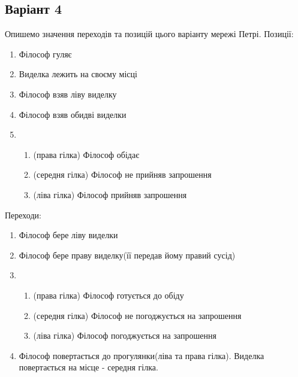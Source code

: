 \subsection*{Варіант 4}

Опишемо значення переходів та позицій цього варіанту мережі Петрі.
Позиції:
\begin{enumerate}
    \item Філософ гуляє
    \item Виделка лежить на своєму місці
    \item Філософ взяв ліву виделку
    \item Філософ взяв обидві виделки
    \item \begin{enumerate}
        \item (права гілка) Філософ обідає
        \item (середня гілка) Філософ не прийняв запрошення
        \item (ліва гілка) Філософ прийняв запрошення
    \end{enumerate}
\end{enumerate}

Переходи:
\begin{enumerate}
    \item Філософ бере ліву виделки
    \item Філософ бере праву виделку(її передав йому правий сусід)
    \item \begin{enumerate}
        \item (права гілка) Філософ готується до обіду
        \item (середня гілка) Філософ не погоджується на запрошення
        \item (ліва гілка) Філософ погоджується на запрошення
    \end{enumerate}
    \item Філософ повертається до прогулянки(ліва та права гілка).
    Виделка повертається на місце - середня гілка.
\end{enumerate}

